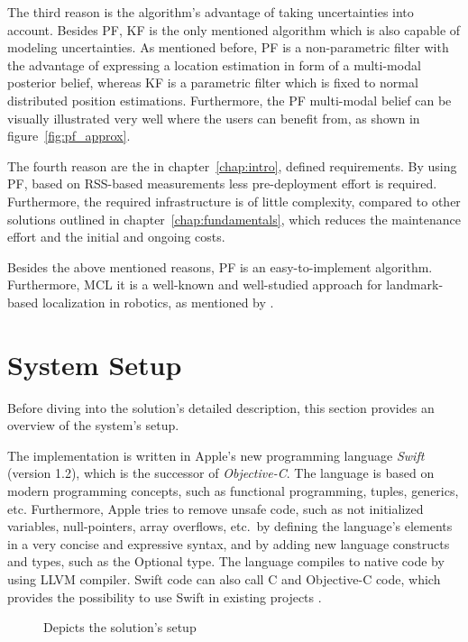 The third reason is the algorithm's advantage of taking uncertainties into account. Besides \ac{PF}, \ac{KF} is the only mentioned algorithm which is also capable of modeling uncertainties. As mentioned before, \acs{PF} is a non-parametric filter with the advantage of expressing a location estimation in form of a multi-modal posterior belief, whereas \ac{KF} is a parametric filter which is fixed to normal distributed position estimations. Furthermore, the \ac{PF} multi-modal belief can be visually illustrated very well where the users can benefit from, as shown in figure~\ref{fig:pf_approx}.

The fourth reason are the in chapter~\ref{chap:intro}, defined requirements. By using \acs{PF}, based on \acs{RSS}-based measurements less pre-deployment effort is required. Furthermore, the required infrastructure is of little complexity, compared to other solutions outlined in chapter~\ref{chap:fundamentals}, which reduces the maintenance effort and the initial and ongoing costs.

Besides the above mentioned reasons, \acl{PF} is an easy-to-implement algorithm. Furthermore, \ac{MCL} it is a well-known and well-studied approach for landmark-based localization in robotics, as mentioned by \citet{thrun:prob_robo}.


\section{System Setup}
Before diving into the solution's detailed description, this section provides an overview of the system's setup.

The implementation is written in Apple's new programming language \emph{Swift} (version 1.2), which is the successor of \emph{Objective-C}. The language is based on modern programming concepts, such as functional programming, tuples, generics, etc. Furthermore, Apple tries to remove unsafe code, such as not initialized variables, null-pointers, array overflows, etc.\ by defining the language's elements in a very concise and expressive syntax, and by adding new language constructs and types, such as the Optional type. The language compiles to native code by using LLVM compiler. Swift code can also call C and Objective-C code, which provides the possibility to use Swift in existing projects \citep{apple:swift}.

\begin{figure}[height=0.45\textheight]
	
	\caption{Depicts the solution's setup}
	\label{fig:algo_architecture}
\end{figure}

